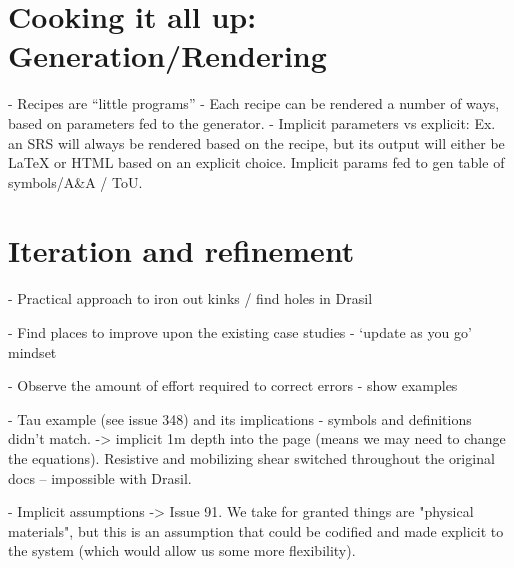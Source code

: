 \section{Cooking it all up: Generation/Rendering}
\label{sec:gen}
  - Recipes are “little programs”
  - Each recipe can be rendered a number of ways, based on parameters fed to the generator.
  -  Implicit parameters vs explicit: Ex. an SRS will always be rendered based on the recipe, but its output will either be LaTeX or HTML based on an explicit choice. Implicit params fed to gen table of symbols/A\&A / ToU.


\section{Iteration and refinement}
\label{sec:iterefine}

  - Practical approach to iron out kinks / find holes in Drasil

  - Find places to improve upon the existing case studies - ‘update as you go’ 
  mindset

  - Observe the amount of effort required to correct errors - show examples

  - Tau example (see issue 348) and its implications - symbols and definitions 
  didn't match. -> implicit 1m depth into the page (means we may need to change 
  the equations). Resistive and mobilizing shear switched throughout the 
  original docs -- impossible with Drasil.

  -  Implicit assumptions -> 
  Issue 91. We take for granted things are "physical 
  materials", but this is an assumption that could be codified and made 
  explicit to the system (which would allow us some more flexibility).